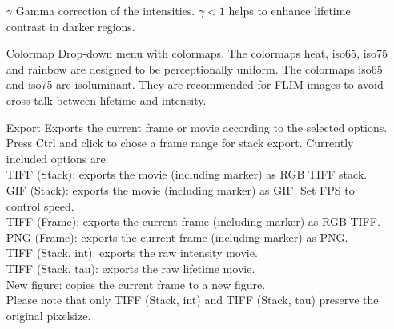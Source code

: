 \documentclass[11pt,onside]{report}
\numberwithin{equation}{chapter}
\begin{document}
\begin{itemize}[leftmargin=3cm]
\item[\textsf{$\gamma$}] Gamma correction of the intensities. $\gamma<1$ helps to enhance lifetime contrast in darker regions.
\item[\textsf{Colormap}] Drop-down menu with colormaps. The colormaps \textsf{heat}, \textsf{iso65}, \textsf{iso75} and \textsf{rainbow} are designed to be perceptionally uniform. The colormaps \textsf{iso65} and \textsf{iso75} are isoluminant. They are recommended for FLIM images to avoid cross-talk between lifetime and intensity.
\item[\textsf{Export}] Exports the current frame or movie according to the selected options. Press \textsf{Ctrl} and click to chose a frame range for stack export.
	Currently included options are: \\\hspace*{0.35cm}
	TIFF (Stack): exports the movie (including marker) as RGB TIFF stack.\\\hspace*{0.35cm}
	GIF (Stack): exports the movie (including marker) as GIF. Set FPS to control speed.\\\hspace*{0.35cm}
	TIFF (Frame): exports the current frame (including marker) as RGB TIFF.\\\hspace*{0.35cm}
	PNG (Frame): exports the current frame (including marker) as PNG.\\\hspace*{0.35cm}
	TIFF (Stack, int): exports the raw intensity movie.\\\hspace*{0.35cm}
	TIFF (Stack, tau): exports the raw lifetime movie.\\\hspace*{0.35cm}
	New figure: copies the current frame to a new figure.\\
	Please note that only TIFF (Stack, int) and TIFF (Stack, tau) preserve the original pixelsize.
\end{itemize} 
\end{document}

